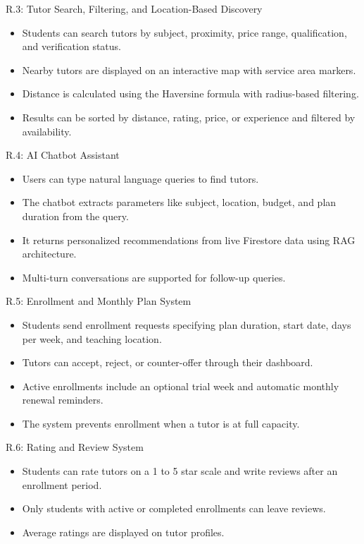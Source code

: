 \documentclass[12pt]{report}
\begin{document}
\noindent R.3: Tutor Search, Filtering, and Location-Based Discovery
\begin{itemize}
\item Students can search tutors by subject, proximity, price range, qualification, and verification status.
\item Nearby tutors are displayed on an interactive map with service area markers.
\item Distance is calculated using the Haversine formula with radius-based filtering.
\item Results can be sorted by distance, rating, price, or experience and filtered by availability.
\end{itemize}

\noindent R.4: AI Chatbot Assistant
\begin{itemize}
\item Users can type natural language queries to find tutors.
\item The chatbot extracts parameters like subject, location, budget, and plan duration from the query.
\item It returns personalized recommendations from live Firestore data using RAG architecture.
\item Multi-turn conversations are supported for follow-up queries.
\end{itemize}

\noindent R.5: Enrollment and Monthly Plan System
\begin{itemize}
\item Students send enrollment requests specifying plan duration, start date, days per week, and teaching location.
\item Tutors can accept, reject, or counter-offer through their dashboard.
\item Active enrollments include an optional trial week and automatic monthly renewal reminders.
\item The system prevents enrollment when a tutor is at full capacity.
\end{itemize}

\noindent R.6: Rating and Review System
\begin{itemize}
\item Students can rate tutors on a 1 to 5 star scale and write reviews after an enrollment period.
\item Only students with active or completed enrollments can leave reviews.
\item Average ratings are displayed on tutor profiles.
\end{itemize}
\end{document}
